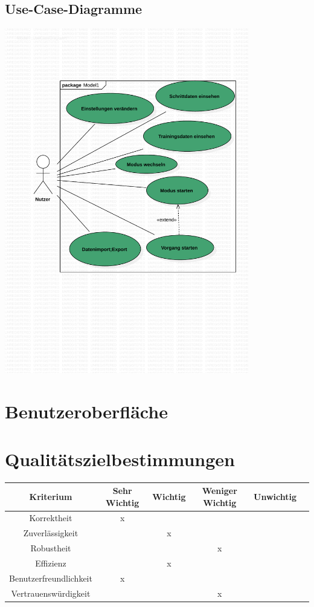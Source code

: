 \documentclass[a4paper,12pt]{article}
\begin{document}
  \subsection{Use-Case-Diagramme}
\begin{center}
\includegraphics[width=0.8\textwidth]{Vorlaeufiges Use-Case Diagram.pdf} %
\end{center}
\section{Benutzeroberfläche}
\section{Qualitätszielbestimmungen}
\begin{tabular}[t]{|c|c|c|c|c|c|}
  \hline
  \textbf{Kriterium} & \textbf{Sehr Wichtig} & \textbf{Wichtig} & \textbf{Weniger Wichtig} & \textbf{Unwichtig}\\
  \hline
  \hline
  Korrektheit & x & & &\\ %
  \hline
  Zuverlässigkeit & & x & &\\ %
  \hline
  Robustheit & & & x &\\  %
  \hline
  Effizienz & & x & &\\ %
  \hline
  Benutzerfreundlichkeit & x & & &\\ %
  \hline
  Vertrauenswürdigkeit & & & x &\\ %
  \hline

\end{tabular}
\end{document}

